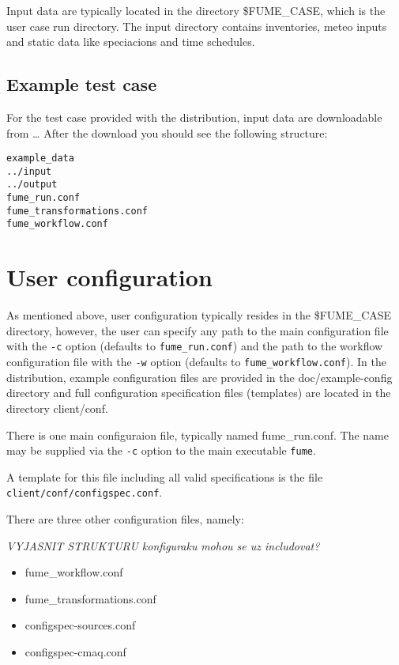 \documentclass[a4paper,11pt]{article}
\begin{document}
Input data are typically located in the directory \$FUME\_CASE, which is
the user case run directory. The input directory contains inventories,
meteo inputs and static data like speciacions and time schedules.

\subsection{Example test case}\label{example-test-case}

For the test case provided with the distribution, input data are
downloadable from \ldots{} After the download you should see the
following structure:

\begin{verbatim}
example_data
../input
../output
fume_run.conf
fume_transformations.conf
fume_workflow.conf
\end{verbatim}


\section{User configuration}\label{user-configuration}

As mentioned above, user configuration typically resides in the
\$FUME\_CASE directory, however, the user can specify any path to the
main configuration file with the \texttt{-c} option (defaults to
\texttt{fume\_run.conf}) and the path to the workflow configuration file
with the \texttt{-w} option (defaults to \texttt{fume\_workflow.conf}).
In the distribution, example configuration files are provided in the
doc/example-config directory and full configuration specification files
(templates) are located in the directory client/conf.

There is one main configuraion file, typically named fume\_run.conf. The
name may be supplied via the \texttt{-c} option to the main executable
\texttt{fume}.

A template for this file including all valid specifications is the file
\texttt{client/conf/configspec.conf}.

There are three other configuration files, namely:

\emph{VYJASNIT STRUKTURU konfiguraku} \emph{mohou se uz includovat?}

\begin{itemize}
\item
  fume\_workflow.conf
\item
  fume\_transformations.conf
\item
  configspec-sources.conf
\item
  configspec-cmaq.conf
\end{itemize}
\end{document}

